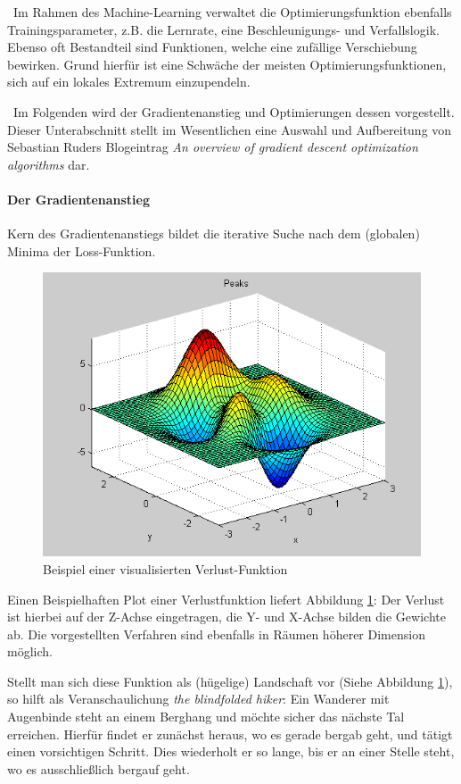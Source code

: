 ~\newline Im Rahmen des Machine-Learning verwaltet die Optimierungsfunktion ebenfalls Trainingsparameter, z.B. die Lernrate, eine Beschleunigungs- und Verfallslogik. Ebenso oft Bestandteil sind Funktionen, welche eine zufällige Verschiebung bewirken. Grund hierfür ist eine Schwäche der meisten Optimierungsfunktionen, sich auf ein lokales Extremum einzupendeln.

~\newline Im Folgenden wird der Gradientenanstieg und Optimierungen dessen vorgestellt. Dieser Unterabschnitt stellt im Wesentlichen eine Auswahl und Aufbereitung von Sebastian Ruders Blogeintrag \textit{An overview of gradient descent optimization algorithms} \cite{OptimizationFunction} dar.
\paragraph{Der Gradientenanstieg} Kern des Gradientenanstiegs bildet die iterative Suche nach dem (globalen) Minima der Loss-Funktion. 
\begin{figure}[h]
	\begin{center}
		\includegraphics[width=0.6\linewidth]{Bilder/optimization}
		\caption[Loss-Function: \url{
			http://www.ahozer.com/research.html}]{Beispiel einer visualisierten Verlust-Funktion}
		\label{fig:Loss}
	\end{center}
\end{figure}
Einen Beispielhaften Plot einer Verlustfunktion liefert Abbildung \ref{fig:Loss}: Der Verlust ist hierbei auf der Z-Achse eingetragen, die Y- und X-Achse bilden die Gewichte ab. Die vorgestellten Verfahren sind ebenfalls in Räumen höherer Dimension möglich.

Stellt man sich diese Funktion als (hügelige) Landschaft vor (Siehe Abbildung \ref{fig:Loss}), so hilft als Veranschaulichung \textit{the blindfolded hiker}: Ein Wanderer mit Augenbinde steht an einem Berghang und möchte sicher das nächste Tal erreichen. Hierfür findet er zunächst heraus, wo es gerade bergab geht, und tätigt einen vorsichtigen Schritt. Dies wiederholt er so lange, bis er an einer Stelle steht, wo es ausschließlich bergauf geht.

